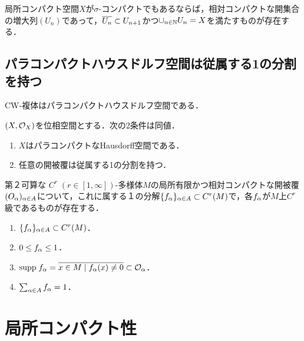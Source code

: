 \documentclass[uplatex,dvipdfmx]{jsreport}
\begin{document}
\begin{proposition}
    局所コンパクト空間$X$が$\sigma$-コンパクトでもあるならば，相対コンパクトな開集合の増大列$(U_n)$であって，$\overline{U_n}\subset U_{n+1}$かつ$\cup_{n\in\mathbb{N}}U_n=X$を満たすものが存在する．
\end{proposition}

\subsection{パラコンパクトハウスドルフ空間は従属する1の分割を持つ}

\begin{tcolorbox}[colframe=ForestGreen, colback=ForestGreen!10!white,breakable,colbacktitle=ForestGreen!40!white,coltitle=black,fonttitle=\bfseries\sffamily,
title=]
    CW-複体はパラコンパクトハウスドルフ空間である．
\end{tcolorbox}

\begin{proposition}
    $(X,\mathcal{O}_X)$を位相空間とする．次の2条件は同値．
    \begin{enumerate}
        \item $X$はパラコンパクトなHausdorff空間である．
        \item 任意の開被覆は従属する1の分割を持つ．
    \end{enumerate}
\end{proposition}

\begin{theorem}
    第２可算な
    $C^r\;(r\in[1,\infty])$-多様体$M$の局所有限かつ相対コンパクトな開被覆$(O_\alpha)_{\alpha\in A}$について，これに属する１の分解$\{f_\alpha\}_{\alpha\in A}\subset C^r(M)$で，各$f_\alpha$が$M$上$C^r$級であるものが存在する．
    \begin{enumerate}
        \item $\{f_\alpha\}_{\alpha\in A}\subset C^r(M)$．
        \item $0\le f_\alpha\le 1$．
        \item $\mathrm{supp}\; f_\alpha=\overline{x\in M\mid f_\alpha(x)\ne 0}\subset\mathcal{O}_\alpha$．
        \item $\sum_{\alpha\in A}f_\alpha=1$．
    \end{enumerate}
\end{theorem}

\section{局所コンパクト性}
\end{document}
